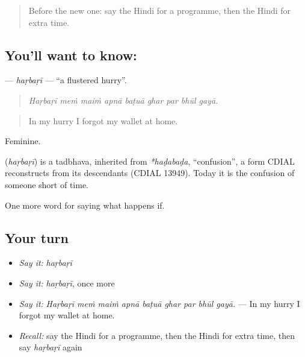 \label{lesson:HI-C537-harbari}



\begin{quote}
Before the new one: say the Hindi for a programme, then the Hindi for extra time.
\end{quote}

\subsection*{You'll want to know: }
\textbf{} — \emph{haṛbaṛī} — \textquotedblleft{}a flustered hurry\textquotedblright{}.

\begin{quote}
        
\end{quote}

\begin{quote}
\emph{Haṛbaṛī meṁ maiṁ apnā baṭuā ghar par bhūl gayā.}
\end{quote}

\begin{quote}
In my hurry I forgot my wallet at home.
\end{quote}

Feminine.

\begin{cousinweb}
\textbf{} (\emph{haṛbaṛī}) is a tadbhava, inherited from \emph{*haḍabaḍa}, \textquotedblleft{}confusion\textquotedblright{}, a form CDIAL reconstructs from its descendants (CDIAL 13949). Today it is the confusion of someone short of time.
\end{cousinweb}

\begin{grammarlens}[title={What you've built}]
One more word for saying what happens if.
\end{grammarlens}

\subsection*{Your turn}
\begin{itemize}
\raggedright
  \item \emph{Say it:} \emph{haṛbaṛī}
  \item \emph{Say it:} \emph{haṛbaṛī}, once more
  \item \emph{Say it:} \emph{Haṛbaṛī meṁ maiṁ apnā baṭuā ghar par bhūl gayā.} — In my hurry I forgot my wallet at home.
  \item \emph{Recall:} say the Hindi for a programme, then the Hindi for extra time, then say \emph{haṛbaṛī} again
\end{itemize}

